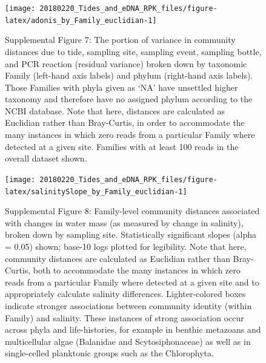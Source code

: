 \documentclass[fleqn,10pt]{wlpeerj}
\begin{document}
\begin{figure}[!ht]

{\centering \texttt{[image: 20180220\_Tides\_and\_eDNA\_RPK\_files/figure-latex/adonis\_by\_Family\_euclidian-1]} 

}

\caption*{\label{fig:SuppFig7} Supplemental Figure 7: The portion of variance in community distances due to tide, sampling site, sampling event, sampling bottle, and PCR reaction (residual variance) broken down by taxonomic Family (left-hand axis labels) and phylum (right-hand axis labels). Those Families with phyla given as `NA' have unsettled higher taxonomy and therefore have no assigned phylum according to the NCBI database. Note that here, distances are calculated as Euclidian rather than Bray-Curtis, in order to accommodate the many instances in which zero reads from a particular Family where detected at a given site. Families with at least 100 reads in the overall dataset shown.}\label{fig:adonis_by_Family_euclidian}
\end{figure}

\begin{figure}[!ht]

{\centering \texttt{[image: 20180220\_Tides\_and\_eDNA\_RPK\_files/figure-latex/salinitySlope\_by\_Family\_euclidian-1]} 

}

\caption*{\label{fig:SuppFig8} Supplemental Figure 8: Family-level community distances associated with changes in water mass (as measured by change in salinity), broken down by sampling site. Statistically significant slopes (alpha = 0.05) shown; base-10 logs plotted for legibility. Note that here, community distances are calculated as Euclidian rather than Bray-Curtis, both to accommodate the many instances in which zero reads from a particular Family where detected at a given site and to appropriately calculate salinity differences. Lighter-colored boxes indicate stronger associations between community identity (within Family) and salinity. These instances of strong association occur across phyla and life-histories, for example in benthic metazoans and multicellular algae (Balanidae and Scytosiphonaceae) as well as in single-celled planktonic groups such as the Chlorophyta.}\label{fig:salinitySlope_by_Family_euclidian}
\end{figure}
\end{document}
